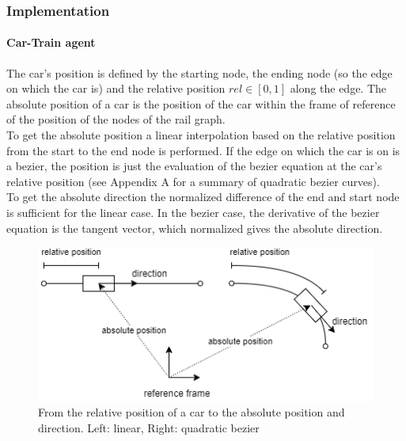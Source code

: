 \documentclass[12pt]{article}
\begin{document}
\subsubsection{Implementation}
\paragraph{Car-Train agent}
The car's position is defined by the starting node, the ending node (so the edge on which the car is) and the relative position \begin{math}{rel \in [0, 1]}\end{math} along the edge. The absolute position of a car is the position of the car within the frame of reference of the position of the nodes of the rail graph.\\
To get the absolute position a linear interpolation based on the relative position from the start to the end node is performed. If the edge on which the car is on is a bezier, the position is just the evaluation of the bezier equation at the car's relative position (see Appendix A for a summary of quadratic bezier curves).\\
To get the absolute direction the normalized difference of the end and start node is sufficient for the linear case. In the bezier case, the derivative of the bezier equation is the tangent vector, which normalized gives the absolute direction.
\begin{figure}[H]
\includegraphics[width=\textwidth]{abspos}
\caption{From the relative position of a car to the absolute position and direction. Left: linear, Right: quadratic bezier}
\end{figure}
\end{document}
